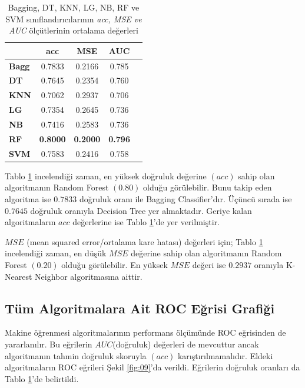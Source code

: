 \documentclass[conference]{IEEEtran}
\begin{document}
\begin{table}[h]
	\centering
	\small
	\begin{tabular}{|l|c|c|c|c|}
		\hline
					& \textbf{acc}	& \textbf{MSE}	& \textbf{AUC}	\\ \hline
		\textbf{Bagg}	& 0.7833		& 0.2166		& 0.785		\\ \hline
		\textbf{DT}		& 0.7645		& 0.2354 		& 0.760		\\ \hline
		\textbf{KNN}	& 0.7062		& 0.2937 		& 0.706		\\ \hline
		\textbf{LG}		& 0.7354		& 0.2645		& 0.736		\\ \hline
		\textbf{NB}		& 0.7416		& 0.2583		& 0.736		\\ \hline
		\textbf{RF}		& \textbf{0.8000}	& \textbf{0.2000}	& \textbf{0.796}	\\ \hline
		\textbf{SVM}	& 0.7583		& 0.2416		& 0.758		\\ \hline
	\end{tabular}
	\caption{Bagging, DT, KNN, LG, NB, RF ve SVM sınıflandırıcılarının \textit{acc, MSE ve AUC} ölçütlerinin ortalama değerleri}
	\label{tbl:01}
\end{table}

\quad Tablo \ref{tbl:01} incelendiği zaman, en yüksek doğruluk değerine $(acc)$ sahip olan algoritmanın Random Forest $(0.80)$ olduğu görülebilir. Bunu takip eden algoritma ise $0.7833$ doğruluk oranı ile Bagging Classifier’dır. Üçüncü sırada ise $0.7645$ doğruluk oranıyla Decision Tree yer almaktadır. Geriye kalan algoritmaların $acc$ değerlerine ise Tablo \ref{tbl:01}'de yer verilmiştir.

\quad $MSE$ (mean squared error/ortalama kare hatası) değerleri için; Tablo \ref{tbl:01} incelendiği zaman, en düşük $MSE$ değerine sahip olan algoritmanın Random Forest $(0.20)$ olduğu görülebilir. En yüksek $MSE$ değeri ise $0.2937$ oranıyla K-Nearest Neighbor algoritmasına aittir.

\pagebreak

\subsection{\textbf{Tüm Algoritmalara Ait ROC Eğrisi Grafiği}}

\quad Makine öğrenmesi algoritmalarının performans ölçümünde ROC eğrisinden de yararlanılır. Bu eğrilerin $AUC$(doğruluk) değerleri de mevcuttur ancak algoritmanın tahmin doğruluk skoruyla $(acc)$ karıştırılmamalıdır\cite{22}. Eldeki algoritmaların ROC eğrileri Şekil \ref{fig:09}'da verildi. Eğrilerin doğruluk oranları da Tablo \ref{tbl:01}'de belirtildi.
\end{document}

